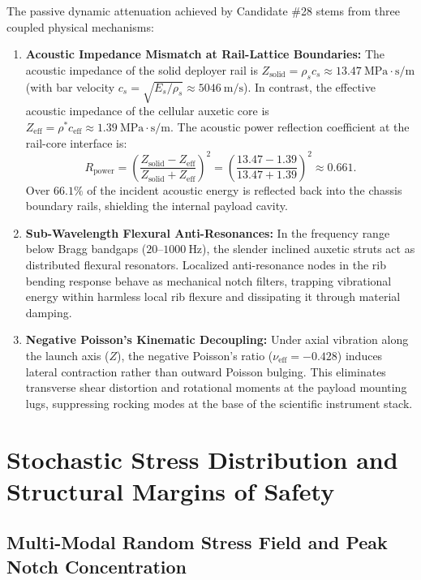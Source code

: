 The passive dynamic attenuation achieved by Candidate \#28 stems from three coupled physical mechanisms:
\begin{enumerate}
\item \textbf{Acoustic Impedance Mismatch at Rail-Lattice Boundaries:} The acoustic impedance of the solid deployer rail is $Z_{\text{solid}} = \rho_s c_s \approx \SI{13.47}{\mega\pascal\cdot\second/\meter}$ (with bar velocity $c_s = \sqrt{E_s/\rho_s} \approx \SI{5046}{\meter/\second}$). In contrast, the effective acoustic impedance of the cellular auxetic core is $Z_{\text{eff}} = \rho^* c_{\text{eff}} \approx \SI{1.39}{\mega\pascal\cdot\second/\meter}$. The acoustic power reflection coefficient at the rail-core interface is:
\begin{equation}
R_{\text{power}} = \left( \frac{Z_{\text{solid}} - Z_{\text{eff}}}{Z_{\text{solid}} + Z_{\text{eff}}} \right)^2 = \left( \frac{13.47 - 1.39}{13.47 + 1.39} \right)^2 \approx \mathbf{0.661}.
\label{eq:impedance_reflection}
\end{equation}
Over $66.1\%$ of the incident acoustic energy is reflected back into the chassis boundary rails, shielding the internal payload cavity.
\item \textbf{Sub-Wavelength Flexural Anti-Resonances:} In the frequency range below Bragg bandgaps ($20\text{--}\SI{1000}{\hertz}$), the slender inclined auxetic struts act as distributed flexural resonators. Localized anti-resonance nodes in the rib bending response behave as mechanical notch filters, trapping vibrational energy within harmless local rib flexure and dissipating it through material damping.
\item \textbf{Negative Poisson's Kinematic Decoupling:} Under axial vibration along the launch axis ($Z$), the negative Poisson's ratio ($\nu_{\text{eff}} = -0.428$) induces lateral contraction rather than outward Poisson bulging. This eliminates transverse shear distortion and rotational moments at the payload mounting lugs, suppressing rocking modes at the base of the scientific instrument stack.
\end{enumerate}

\section{Stochastic Stress Distribution and Structural Margins of Safety}
\label{sec:stress_margins}

\subsection{Multi-Modal Random Stress Field and Peak Notch Concentration}


